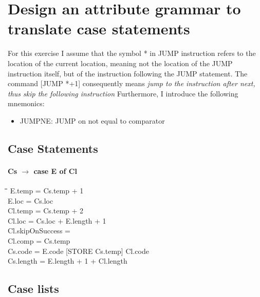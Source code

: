 \section{Design an attribute grammar to translate case statements}

For this exercise I assume that the symbol * in JUMP instruction refers to the location of the current location, meaning not the location of the JUMP instruction itself, but of the instruction following the JUMP statement. The command [JUMP *+1] consequently means \emph{jump to the instruction after next, thus skip the following instruction}
Furthermore, I introduce the following mnemonics:
\begin{itemize}
	\item JUMPNE: JUMP on not equal to comparator
\end{itemize}

\subsection{Case Statements}
\paragraph{Cs $\rightarrow$ case E of Cl}
\begin{tabbing}
	\hspace*{0.5cm}\=\hspace*{3.3cm}\=\hspace*{0.5cm}\=\hspace*{10cm}\= \kill
	\>E.temp 						\>= \>Cs.temp + 1\\
	\>E.loc 						\>= \>Cs.loc \\
	\>Cl.temp 					\>= \>Cs.temp + 2 \\
	\>Cl.loc 						\>= \>Cs.loc + E.length + 1 \\
	\>Cl.skipOnSuccess	\>=  \\
	\>Cl.comp 					\>= \>Cs.temp \\
	\>Cs.code 					\>= \>E.code [STORE Cs.temp] Cl.code \\
	\>Cs.length 				\>= \>E.length + 1 + Cl.length
\end{tabbing}

\subsection{Case lists}
